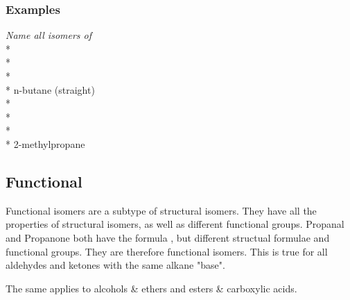 \documentclass[11pt,twoside]{article}
\begin{document}
			\subsubsection{Examples}
				\emph{Name all isomers of }
				\\* \\*
				\\* \\*	
				n-butane (straight)
				\\* \\*
				\\* \\*
				2-methylpropane
		\subsection{Functional}
			Functional isomers are a subtype of structural isomers. They have all the properties of structural isomers, as well as different functional groups.
			Propanal and Propanone both have the formula , but different structual formulae and functional groups. They are therefore functional isomers. This is true for all aldehydes and ketones with the same alkane "base".
			
			The same applies to alcohols \& ethers and esters \& carboxylic acids.
\end{document}
